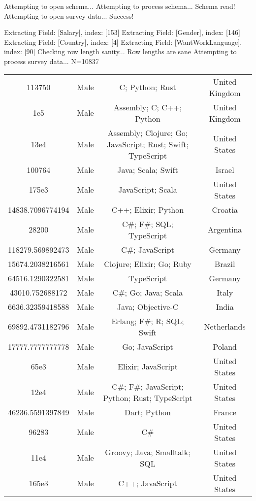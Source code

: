 Attempting to open schema...
Attempting to process schema...
Schema read!
Attempting to open survey data...
Success!

Extracting Field: [Salary], index: [153]
Extracting Field: [Gender], index: [146]
Extracting Field: [Country], index: [4]
Extracting Field: [WantWorkLanguage], index: [90]
Checking row length sanity...
Row lengths are sane
Attempting to process survey data...
N=10837
\begin{center}
\begin{tabular}{ |c|c|c|c| }
113750  &  Male  &  C; Python; Rust  &  United Kingdom  \\ 
1e5  &  Male  &  Assembly; C; C++; Python  &  United Kingdom  \\ 
13e4  &  Male  &  Assembly; Clojure; Go; JavaScript; Rust; Swift; TypeScript  &  United States  \\ 
100764  &  Male  &  Java; Scala; Swift  &  Israel  \\ 
175e3  &  Male  &  JavaScript; Scala  &  United States  \\ 
14838.7096774194  &  Male  &  C++; Elixir; Python  &  Croatia  \\ 
28200  &  Male  &  C\#; F\#; SQL; TypeScript  &  Argentina  \\ 
118279.569892473  &  Male  &  C\#; JavaScript  &  Germany  \\ 
15674.2038216561  &  Male  &  Clojure; Elixir; Go; Ruby  &  Brazil  \\ 
64516.1290322581  &  Male  &  TypeScript  &  Germany  \\ 
43010.752688172  &  Male  &  C\#; Go; Java; Scala  &  Italy  \\ 
6636.32359418588  &  Male  &  Java; Objective-C  &  India  \\ 
69892.4731182796  &  Male  &  Erlang; F\#; R; SQL; Swift  &  Netherlands  \\ 
17777.7777777778  &  Male  &  Go; JavaScript  &  Poland  \\ 
65e3  &  Male  &  Elixir; JavaScript  &  United States  \\ 
12e4  &  Male  &  C\#; F\#; JavaScript; Python; Rust; TypeScript  &  United States  \\ 
46236.5591397849  &  Male  &  Dart; Python  &  France  \\ 
96283  &  Male  &  C\#  &  United States  \\ 
11e4  &  Male  &  Groovy; Java; Smalltalk; SQL  &  United States  \\ 
165e3  &  Male  &  C++; JavaScript  &  United States  \\ 

\end{tabular}
\end{center}
